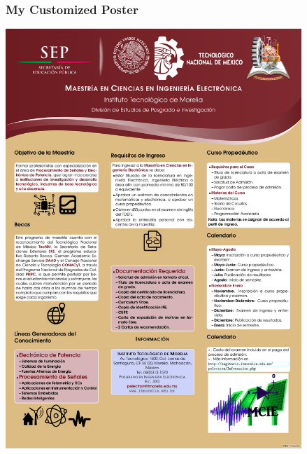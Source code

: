 \documentclass[9pt]{beamer}
\begin{document}
\begin{frame}
  \frametitle{My Customized Poster}
    \includegraphics[width=11.2cm]{mytheme.pdf} 
\end{frame}
\end{document}
